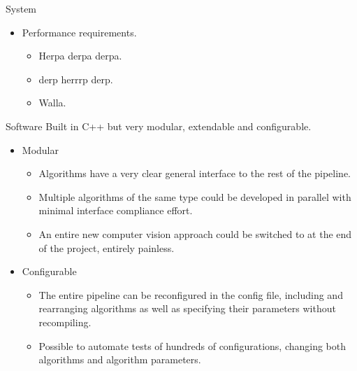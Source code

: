 \documentclass[final,hyperref={pdfpagelabels=false}]{beamer}
\begin{document}
\begin{frame}[t]
\begin{columns}[t]
\begin{column}{.465\textwidth}
\begin{block}{System}
\begin{itemize}
\item Performance requirements.
\begin{itemize}
\item Herpa derpa derpa.
\item derp herrrp derp.
\item Walla.
\end{itemize}
\end{itemize}

\end{block}


\begin{block}{Software}
Built in C++ but very modular, extendable and configurable.
\begin{itemize}
\item Modular
\begin{itemize}
\item Algorithms have a very clear general interface to the rest of the pipeline.
\item Multiple algorithms of the same type could be developed in parallel with minimal interface compliance effort.
\item An entire new computer vision approach could be switched to at the end of the project, entirely painless.
\end{itemize}
\end{itemize}
\begin{itemize}
\item Configurable
\begin{itemize}
\item The entire pipeline can be reconfigured in the config file, including and rearranging algorithms as well as specifying their parameters without recompiling.
\item Possible to automate tests of hundreds of configurations, changing both algorithms and algorithm parameters.
\end{itemize}
\end{itemize}
\end{block}



\end{column}
\end{columns}
\end{frame}
\end{document}
